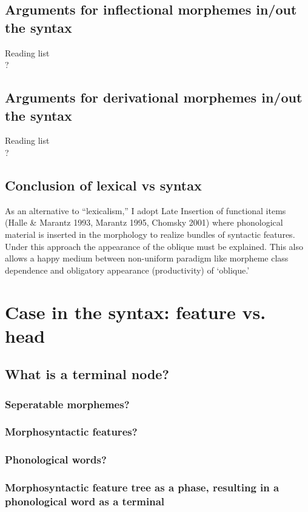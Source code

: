 \documentclass{article}
\begin{document}
\subsection{Arguments for inflectional morphemes in/out the syntax}
Reading list\\
?

\subsection{Arguments for derivational morphemes in/out the syntax}

Reading list\\
?

\subsection{Conclusion of lexical vs syntax}
As an alternative to ``lexicalism,” I adopt Late Insertion of functional items (Halle \& Marantz 1993, Marantz 1995, Chomsky 2001) where phonological material is inserted in the morphology to realize bundles of syntactic features. Under this approach the appearance of the oblique must be explained. This also allows a happy medium between non-uniform paradigm like morpheme class dependence and obligatory appearance (productivity) of `oblique.'


\section{Case in the syntax: feature vs. head}

\subsection{What is a terminal node?}
\subsubsection{Seperatable morphemes?}
\subsubsection{Morphosyntactic features?}
\subsubsection{Phonological words?}
\subsubsection{Morphosyntactic feature tree as a phase, resulting in a phonological word as a terminal}
\end{document}
